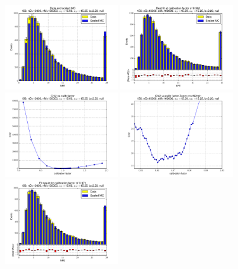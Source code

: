 
 \begin{figure}[htbp] \begin{center} 
\includegraphics[width=0.45\textwidth]{../FIGURES/156/FIG_Data_and_scaled_MC.pdf} 
\includegraphics[width=0.45\textwidth]{../FIGURES/156/FIG_Best_fit_at_calibration_factor_of_0_960.pdf} 
\includegraphics[width=0.45\textwidth]{../FIGURES/156/FIG_Chi2_vs_calib_factor.pdf} 
\includegraphics[width=0.45\textwidth]{../FIGURES/156/FIG_Chi2_vs_calib_factor_Zoom_on_chi2min.pdf} 
\includegraphics[width=0.45\textwidth]{../FIGURES/156/FIG_Fit_result_for_calibration_factor_of_0_971.pdf} 

\end{center}
\end{figure}
